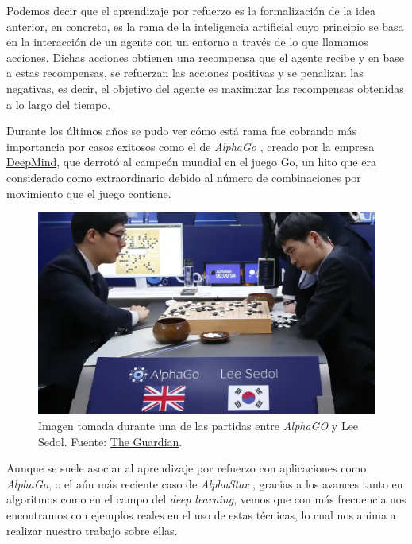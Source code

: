 Podemos decir que el aprendizaje por refuerzo es la formalización de la idea anterior, en concreto, es la rama de la inteligencia artificial cuyo principio se basa en la interacción de un agente con un entorno a través de lo que llamamos acciones. Dichas acciones obtienen una recompensa que el agente recibe y en base a estas recompensas, se refuerzan las acciones positivas y se penalizan las negativas, es decir, el objetivo del agente es maximizar las recompensas obtenidas a lo largo del tiempo.
\medskip

Durante los últimos años se pudo ver cómo está rama fue cobrando más importancia por casos exitosos como el de \textit{AlphaGo} \citep{silver2016mastering}, creado por la empresa \href{deepmind.com}{DeepMind}, que derrotó al campeón mundial en el juego Go, un hito que era considerado como extraordinario debido al número de combinaciones por movimiento que el juego contiene.
\medskip

\begin{figure}[ht!]
  \centering
  \includegraphics[width=1\textwidth]{figuras/alphago.png}
  \caption[Imagen tomada durante una de las partidas entre \textit{AlphaGO} y Lee Sedol.]{Imagen tomada durante una de las partidas entre \textit{AlphaGO} y Lee Sedol. Fuente: \href{https://www.theguardian.com/technology/2016/mar/15/alphago-what-does-google-advanced-software-go-next}{The Guardian}.}
  \label{fig-alphago}
\end{figure}

Aunque se suele asociar al aprendizaje por refuerzo con aplicaciones como \textit{AlphaGo}, o el aún más reciente caso de \textit{AlphaStar} \citep{alphastar}, gracias a los avances tanto en algoritmos como en el campo del \textit{deep learning}, vemos que con más frecuencia nos encontramos con ejemplos reales en el uso de estas técnicas, lo cual nos anima a realizar nuestro trabajo sobre ellas.
\medskip

